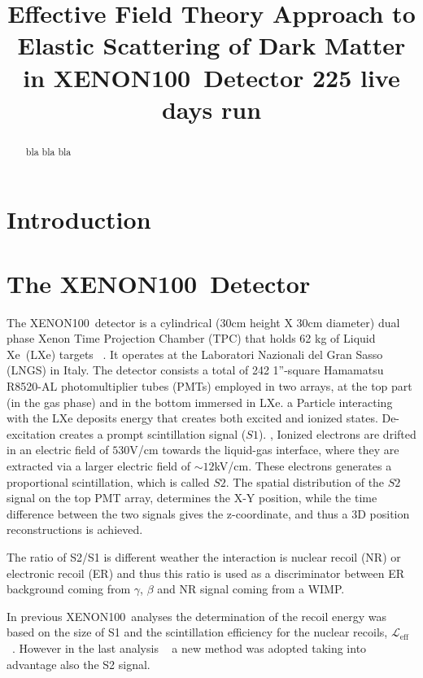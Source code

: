 \documentclass[twocolumn, showpacs, showkeys, amsmath, amssymb, floatfix]{revtex4}
\newcommand \Leff{$\mathcal{L}_{\mathrm{eff}}$}
\newcommand{\Xehund}{{XENON100}}
\newcommand{\Xe}{{\sc Xe}}
\begin{document}
\linenumbers 

\title{Effective Field Theory Approach to Elastic Scattering of Dark Matter in  \Xehund\ Detector 225 live days run}
%


\begin{abstract} 

bla bla bla

\end{abstract}

\pacs{}

\maketitle 
\section{Introduction}
\section{The \Xehund\  Detector}
The \Xehund\ detector is a cylindrical (30cm height X 30cm diameter) dual phase Xenon Time Projection Chamber (TPC) that holds 62 kg of Liquid \Xe\ (LXe) targets ~\cite{xe100_instr2012}. It operates at the Laboratori Nazionali del Gran Sasso (LNGS) in Italy. The detector consists a total of 242 1”-square Hamamatsu R8520-AL photomultiplier tubes (PMTs) employed in two arrays, at the top part (in the gas phase) and in the bottom immersed in LXe. a Particle interacting with the LXe deposits energy that creates both excited and ionized states. De-excitation creates a prompt scintillation signal ($S1$). ,  Ionized electrons are drifted in an electric field of $530$V/cm towards the liquid-gas interface, where they are extracted via a larger electric field of $\sim12$kV/cm. These electrons generates a proportional scintillation, which is called $S2$. The spatial distribution of the $S2$ signal on the top PMT array, determines the X-Y position, while the time difference between the two signals gives the z-coordinate, and thus a 3D position reconstructions is achieved.

The ratio of S2/S1 is different weather the interaction is nuclear recoil (NR) or electronic recoil (ER) and thus this ratio is used as a discriminator between ER background coming from $\gamma$, $\beta$ and NR signal coming from a WIMP. 

In previous \Xehund\ analyses the determination of the recoil energy was based on the size of S1 and the scintillation efficiency for the nuclear recoils, \Leff ~\cite{xe100_run10_si}. However in the last analysis ~\cite{xe100_run_combination} a new method was adopted taking into advantage also the S2 signal.
      
\end{document}
